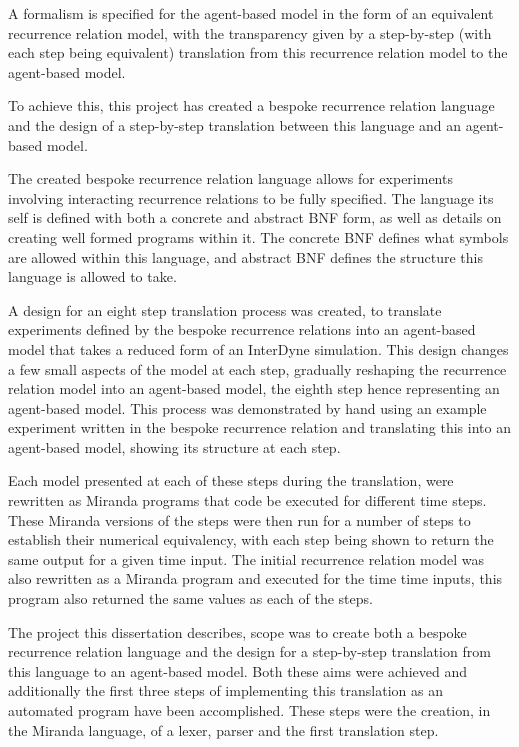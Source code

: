 \documentclass{article}
\begin{document}
A formalism is specified for the agent-based model in the form of an equivalent recurrence relation model, with the transparency given by a step-by-step (with each step being equivalent) translation from this recurrence relation model to the agent-based model. 

To achieve this, this project has created a bespoke recurrence relation language and the design of a step-by-step translation between this language and an agent-based model.  

The created bespoke recurrence relation language allows for experiments involving interacting recurrence relations to be fully specified. The language its self is defined with both a concrete and abstract BNF form, as well as details on creating well formed programs within it. The concrete BNF defines what symbols are allowed within this language, and abstract BNF defines the structure this language is allowed to take.   

A design for an eight step translation process was created, to translate experiments defined by the bespoke recurrence relations into an agent-based model that takes a reduced form of an InterDyne simulation. This design changes a few small aspects of the model at each step, gradually reshaping the recurrence relation model into an agent-based model, the eighth step hence representing an agent-based model. This process was demonstrated by hand using an example experiment written in the bespoke recurrence relation and translating this into an agent-based model, showing its structure at each step. 

Each model presented at each of these steps during the translation, were rewritten as Miranda programs that code be executed for different time steps. These Miranda versions of the steps were then run for a number of steps to establish their numerical equivalency, with each step being shown to return the same output for a given time input. The initial recurrence relation model was also rewritten as a Miranda program and executed for the time time inputs, this program also returned the same values as each of the steps.  

The project this dissertation describes, scope was to create both a bespoke recurrence relation language and the design for a step-by-step translation from this language to an agent-based model. Both these aims were achieved and additionally the first three steps of implementing this translation as an automated program have been accomplished. These steps were the creation, in the Miranda language, of a lexer, parser and the first translation step. 
\end{document}
